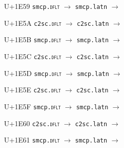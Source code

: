 \documentclass{article}
\begin{document}
\begin{substitutions}
\goodbreak

U+1E59  \linebreak
    \texttt{smcp.\textsc{dflt}} $\to$  \linebreak
    \texttt{smcp.latn} $\to$  

\goodbreak

U+1E5A  \linebreak
    \texttt{c2sc.\textsc{dflt}} $\to$  \linebreak
    \texttt{c2sc.latn} $\to$  

\goodbreak

U+1E5B  \linebreak
    \texttt{smcp.\textsc{dflt}} $\to$  \linebreak
    \texttt{smcp.latn} $\to$  

\goodbreak

U+1E5C  \linebreak
    \texttt{c2sc.\textsc{dflt}} $\to$  \linebreak
    \texttt{c2sc.latn} $\to$  

\goodbreak

U+1E5D  \linebreak
    \texttt{smcp.\textsc{dflt}} $\to$  \linebreak
    \texttt{smcp.latn} $\to$  

\goodbreak

U+1E5E  \linebreak
    \texttt{c2sc.\textsc{dflt}} $\to$  \linebreak
    \texttt{c2sc.latn} $\to$  

\goodbreak

U+1E5F  \linebreak
    \texttt{smcp.\textsc{dflt}} $\to$  \linebreak
    \texttt{smcp.latn} $\to$  

\goodbreak

U+1E60  \linebreak
    \texttt{c2sc.\textsc{dflt}} $\to$  \linebreak
    \texttt{c2sc.latn} $\to$  

\goodbreak

U+1E61  \linebreak
    \texttt{smcp.\textsc{dflt}} $\to$  \linebreak
    \texttt{smcp.latn} $\to$  


\end{substitutions}
\end{document}

